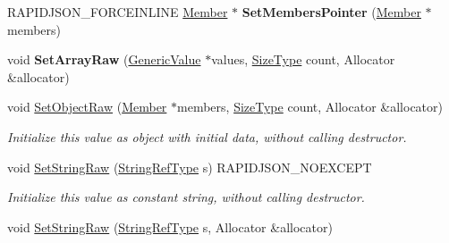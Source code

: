 \begin{DoxyCompactItemize}
\item 
R\+A\+P\+I\+D\+J\+S\+O\+N\+\_\+\+F\+O\+R\+C\+E\+I\+N\+L\+I\+NE \hyperlink{classGenericValue_a7ccf27c44058b4c11c3efc6473afb886}{Member} $\ast$ {\bfseries Set\+Members\+Pointer} (\hyperlink{classGenericValue_a7ccf27c44058b4c11c3efc6473afb886}{Member} $\ast$members)\hypertarget{classGenericValue_a0b488cb0120b154eadde27dc0e694019}{}\label{classGenericValue_a0b488cb0120b154eadde27dc0e694019}

\item 
void {\bfseries Set\+Array\+Raw} (\hyperlink{classGenericValue}{Generic\+Value} $\ast$values, \hyperlink{rapidjson_8h_a5ed6e6e67250fadbd041127e6386dcb5}{Size\+Type} count, Allocator \&allocator)\hypertarget{classGenericValue_a8f5f309065479de40a16cf28a340da65}{}\label{classGenericValue_a8f5f309065479de40a16cf28a340da65}

\item 
void \hyperlink{classGenericValue_a26c8ec7d68858df1038506df7fcff22d}{Set\+Object\+Raw} (\hyperlink{classGenericValue_a7ccf27c44058b4c11c3efc6473afb886}{Member} $\ast$members, \hyperlink{rapidjson_8h_a5ed6e6e67250fadbd041127e6386dcb5}{Size\+Type} count, Allocator \&allocator)\hypertarget{classGenericValue_a26c8ec7d68858df1038506df7fcff22d}{}\label{classGenericValue_a26c8ec7d68858df1038506df7fcff22d}

\begin{DoxyCompactList}\small\item\em Initialize this value as object with initial data, without calling destructor. \end{DoxyCompactList}\item 
void \hyperlink{classGenericValue_a1451603922dcdf34976f125dc60f70ee}{Set\+String\+Raw} (\hyperlink{classGenericValue_a32e0f30ee278072374c8168b14d3317f}{String\+Ref\+Type} s) R\+A\+P\+I\+D\+J\+S\+O\+N\+\_\+\+N\+O\+E\+X\+C\+E\+PT\hypertarget{classGenericValue_a1451603922dcdf34976f125dc60f70ee}{}\label{classGenericValue_a1451603922dcdf34976f125dc60f70ee}

\begin{DoxyCompactList}\small\item\em Initialize this value as constant string, without calling destructor. \end{DoxyCompactList}\item 
void \hyperlink{classGenericValue_ad3d91db36dfdbfc1af40a79aae07723c}{Set\+String\+Raw} (\hyperlink{classGenericValue_a32e0f30ee278072374c8168b14d3317f}{String\+Ref\+Type} s, Allocator \&allocator)\hypertarget{classGenericValue_ad3d91db36dfdbfc1af40a79aae07723c}{}\label{classGenericValue_ad3d91db36dfdbfc1af40a79aae07723c}


\end{DoxyCompactItemize}
